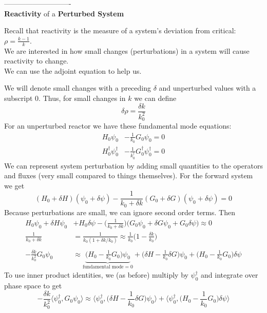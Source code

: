 \documentclass[12pt]{article}
\begin{document}
----------------------------\\
\textbf{Reactivity} of a \textbf{Perturbed System}

Recall that reactivity is the measure of a system's deviation from critical: $\rho = \frac{k-1}{k}$.\\
We are interested in how small changes (perturbations) in a system will cause reactivity to change.\\
We can use the adjoint equation to help us.

We will denote small changes with a preceding $\delta$ and unperturbed values with a subscript $0$. Thus, for small changes in $k$ we can define 
\[
\delta \rho = \frac{\delta k}{k_0^2}
\]
For an unperturbed reactor we have these fundamental mode equations:
\begin{align*}
H_0\psi_0 &- \frac{1}{k_0}G_0\psi_0 = 0\\
H_0^{\dagger}\psi_0^{\dagger} &- \frac{1}{k_0^{\dagger}}G_0^{\dagger}\psi_0^{\dagger} = 0
\end{align*}
We can represent system perturbation by adding small quantities to the operators and fluxes (very small compared to things themselves). For the forward system we get
\[
(H_0 + \delta H)(\psi_0 + \delta \psi) - \frac{1}{k_0 + \delta k}(G_0 + \delta G)(\psi_0 + \delta \psi) = 0
\]
Because perturbations are small, we can ignore second order terms. Then
\begin{align*}
H_0 \psi_0 + \delta H \psi_0 &+ H_0\delta\psi - \bigl(\frac{1}{k_0 + \delta k}\bigr)\bigl(G_0\psi_0 + \delta G \psi_0 + G_0\delta\psi \bigr) \approx 0 \\
%
\frac{1}{k_0 + \delta k} &= \frac{1}{k_0(1 + \delta k/k_0)} \approx \frac{1}{k_0}\bigl(1 - \frac{\delta k}{k_0}\bigr) \\
\\
%
-\frac{\delta k}{k_0^2}G_0\psi_0 &\approx \underbrace{\bigl(H_0 - \frac{1}{k_0}G_0 \bigr)\psi_0}_{\text{fundamental mode}=0} + \bigl(\delta H - \frac{1}{k_0}\delta G\bigr)\psi_0  + \bigl(H_0 - \frac{1}{k_0}G_0 \bigr)\delta \psi
\end{align*}
To use inner product identities, we (as before) multiply by $\psi_0^{\dagger}$ and integrate over phase space to get
\begin{equation}
-\frac{\delta k}{k_0^2} \langle \psi_0^{\dagger}, G_0\psi_0 \rangle \approx \langle \psi_0^{\dagger},\bigl(\delta H - \frac{1}{k_0}\delta G\bigr)\psi_0 \rangle + \langle \psi_0^{\dagger},\bigl(H_0 - \frac{1}{k_0}G_0 \bigr)\delta \psi \rangle
\label{eq:perturb}
\end{equation}
\end{document}
